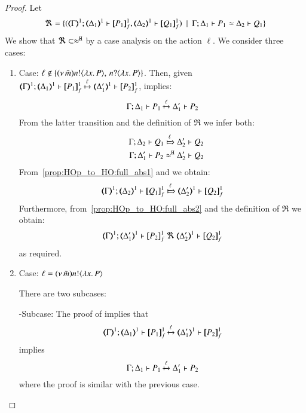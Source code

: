 \begin{proof}
	\noi Let
%
	\[
		\Re = \set{(\horel{\mapt{\Gamma}^{1}}{\mapt{\Delta_1}^{1}}{\pmapp{P_1}{1}{f}}{,}{\mapt{\Delta_2}^{1}}{\pmapp{Q_1}{1}{f}}) \setbar \horel{\Gamma}{\Delta_1}{P_1}{\wb}{\Delta_2}{Q_1}}
	\]
%
	We show that $\Re \subset \approx^\mathtt{H}$ by a case analysis on the action $\ell$.
	We consider three cases:
	\begin{enumerate}[1.]

	\item Case: $\ell \notin \{(\nu\, \tilde{m}) n ! \langle \lambda x.\,P \rangle,\, n ? \langle \lambda x.\,P \rangle\}$.
	Then, given $\horel{\mapt{\Gamma}^{1}}{\mapt{\Delta_1}^{1}}{\pmapp{P_1}{1}{f}}{\hby{\ell}}{\mapt{\Delta_1'}^{1}}{\pmapp{P_2}{1}{f}}$,
	 implies:
	\[
		\Gamma; \Delta_1 \vdash P_1 \xmapsto{\ell} \Delta_1' \vdash P_2
	\]
%
	\noi From the latter transition and the definition of $\Re$ we infer both:
%
	\begin{eqnarray}
		&&\horel{\Gamma}{\Delta_2}{Q_1}{\Hby{\ell}}{\Delta_2'}{Q_2}
		\label{prop:HOp_to_HO:full_abs1}
		\\
		&&\horel{\Gamma}{\Delta_1'}{P_2}{\hwb}{\Delta_2'}{Q_2}
		\label{prop:HOp_to_HO:full_abs2}
	\end{eqnarray}
%
	\noi From~\ref{prop:HOp_to_HO:full_abs1} and  we obtain:
%
	\[
		\horel{\mapt{\Gamma}^{1}}{\mapt{\Delta_2}^{1}}{\pmapp{Q_1}{1}{f}}{\Hby{\ell}}{\mapt{\Delta_2'}^{1}}{\pmapp{Q_2}{1}{f}}
	\]
%
	\noi Furthermore, from~\ref{prop:HOp_to_HO:full_abs2} and the definition of $\Re$ we obtain:
%
	\[
		\horel{\mapt{\Gamma}^{1}}{\mapt{\Delta_1'}^{1}}{\pmapp{P_2}{1}{f}}{\ \Re\ }{\mapt{\Delta_2'}^{1}}{\pmapp{Q_2}{1}{f}}
	\]
%
	\noi as required.

	\item Case: $\ell = (\nu\, \tilde{m}) n ! \langle \lambda x.\,P \rangle$

	\noi There are two subcases:

	\noi -Subcase: The proof of  implies that
%
	\[
		\horel{\mapt{\Gamma}^{1}}{\mapt{\Delta_1}^{1}}{\pmapp{P_1}{1}{f}}{\hby{\ell}}{\mapt{\Delta_1'}^{1}}{\pmapp{P_2}{1}{f}}
	\]
%
	\noi implies
%
	\[
		\Gamma; \Delta_1 \vdash P_1 \xmapsto{\ell} \Delta_1' \vdash P_2
	\]
%
	\noi where the proof is similar with the previous case.


\end{enumerate}
\end{proof}
